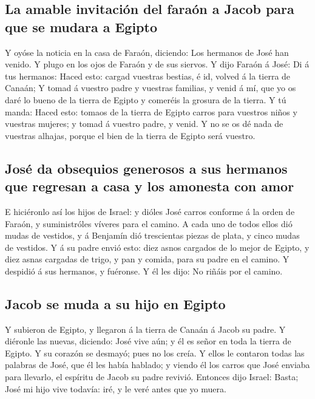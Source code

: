 \hypertarget{la-amable-invitaciuxf3n-del-farauxf3n-a-jacob-para-que-se-mudara-a-egipto}{%
\subsection{La amable invitación del faraón a Jacob para que se mudara a
Egipto}\label{la-amable-invitaciuxf3n-del-farauxf3n-a-jacob-para-que-se-mudara-a-egipto}}

 Y oyóse la noticia en la casa de Faraón, diciendo: Los
hermanos de José han venido. Y plugo en los ojos de Faraón y de sus
siervos.  Y dijo Faraón á José: Di á tus hermanos: Haced
esto: cargad vuestras bestias, é id, volved á la tierra de Canaán;
 Y tomad á vuestro padre y vuestras familias, y venid á mí,
que yo os daré lo bueno de la tierra de Egipto y comeréis la grosura de
la tierra.  Y tú manda: Haced esto: tomaos de la tierra de
Egipto carros para vuestros niños y vuestras mujeres; y tomad á vuestro
padre, y venid.  Y no se os dé nada de vuestras alhajas,
porque el bien de la tierra de Egipto será vuestro.

\hypertarget{josuxe9-da-obsequios-generosos-a-sus-hermanos-que-regresan-a-casa-y-los-amonesta-con-amor}{%
\subsection{José da obsequios generosos a sus hermanos que regresan a
casa y los amonesta con
amor}\label{josuxe9-da-obsequios-generosos-a-sus-hermanos-que-regresan-a-casa-y-los-amonesta-con-amor}}

 E hiciéronlo así los hijos de Israel: y dióles José carros
conforme á la orden de Faraón, y suministróles víveres para el camino.
 A cada uno de todos ellos dió mudas de vestidos, y á
Benjamín dió trescientas piezas de plata, y cinco mudas de vestidos.
 Y á su padre envió esto: diez asnos cargados de lo mejor
de Egipto, y diez asnas cargadas de trigo, y pan y comida, para su padre
en el camino.  Y despidió á sus hermanos, y fuéronse. Y él
les dijo: No riñáis por el camino.

\hypertarget{jacob-se-muda-a-su-hijo-en-egipto}{%
\subsection{Jacob se muda a su hijo en
Egipto}\label{jacob-se-muda-a-su-hijo-en-egipto}}

 Y subieron de Egipto, y llegaron á la tierra de Canaán á
Jacob su padre.  Y diéronle las nuevas, diciendo: José vive
aún; y él es señor en toda la tierra de Egipto. Y su corazón se desmayó;
pues no los creía.  Y ellos le contaron todas las palabras
de José, que él les había hablado; y viendo él los carros que José
enviaba para llevarlo, el espíritu de Jacob su padre revivió.
 Entonces dijo Israel: Basta; José mi hijo vive todavía:
iré, y le veré antes que yo muera.

